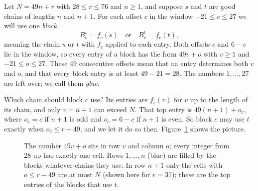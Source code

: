 \documentclass[11pt]{article}
\theoremstyle{definition}
\theoremstyle{remark}
\newcommand{\blk}[2]{B^{#2}_{#1}}
\begin{document}
Let $N=49n+r$ with $28\le r\le 76$ and $n\ge1$, and suppose $s$ and $t$ are good chains of lengths
$n$ and $n+1$. For each offset $c$ in the window $-21\le c\le 27$ we will use one \emph{block}
\[
  \blk{c}{s}=f_c(s)\quad\text{or}\quad \blk{c}{t}=f_c(t),
\]
meaning the chain $s$ or $t$ with $f_c$ applied to each entry. Both offsets $c$ and $6-c$ lie in the
window, so every entry of a block has the form $49v+o$ with $v\ge1$ and $-21\le o\le27$. These
$49$ consecutive offsets mean that an entry determines both $v$ and $o$, and that every block entry
is at least $49-21=28$. The numbers $1,\dots,27$ are left over; we call them \emph{glue}.

Which chain should block $c$ use? Its entries are $f_c(v)$ for $v$ up to the length of its chain,
and only $v=n+1$ can exceed $N$. That top entry is $49(n+1)+o_c$, where $o_c=c$ if $n+1$ is odd and
$o_c=6-c$ if $n+1$ is even. So block $c$ may use $t$ exactly when $o_c\le r-49$, and we let it do so
then. Figure~\ref{fig:grid} shows the picture.

\begin{figure}[ht]
\centering
{}
\caption{The number $49v+o$ sits in row $v$ and column $o$; every integer from $28$ up has exactly
one cell. Rows $1,\dots,n$ (blue) are filled by the blocks whatever chains they use. In row $n+1$
only the cells with $o\le r-49$ are at most $N$ (shown here for $r=37$); these are the top entries
of the blocks that use $t$.}
\label{fig:grid}
\end{figure}
\end{document}
